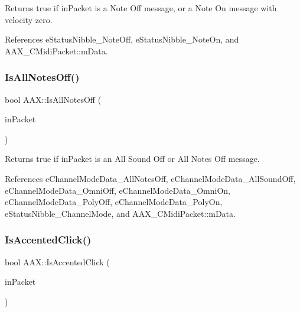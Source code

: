 Returns true if {\ttfamily in\+Packet} is a Note Off message, or a Note On message with velocity zero. 



References e\+Status\+Nibble\+\_\+\+Note\+Off, e\+Status\+Nibble\+\_\+\+Note\+On, and A\+A\+X\+\_\+\+C\+Midi\+Packet\+::m\+Data.

\mbox{\label{a00852_a509974acde19fde832cd5fdeb5eaabe2}} 
\subsubsection{\texorpdfstring{IsAllNotesOff()}{IsAllNotesOff()}}
{\footnotesize\ttfamily bool A\+A\+X\+::\+Is\+All\+Notes\+Off (\begin{DoxyParamCaption}\item[{const \mbox{\hyperlink{a01429}{A\+A\+X\+\_\+\+C\+Midi\+Packet}} $\ast$}]{in\+Packet }\end{DoxyParamCaption})\hspace{0.3cm}{\ttfamily [inline]}}



Returns true if {\ttfamily in\+Packet} is an All Sound Off or All Notes Off message. 



References e\+Channel\+Mode\+Data\+\_\+\+All\+Notes\+Off, e\+Channel\+Mode\+Data\+\_\+\+All\+Sound\+Off, e\+Channel\+Mode\+Data\+\_\+\+Omni\+Off, e\+Channel\+Mode\+Data\+\_\+\+Omni\+On, e\+Channel\+Mode\+Data\+\_\+\+Poly\+Off, e\+Channel\+Mode\+Data\+\_\+\+Poly\+On, e\+Status\+Nibble\+\_\+\+Channel\+Mode, and A\+A\+X\+\_\+\+C\+Midi\+Packet\+::m\+Data.

\mbox{\label{a00852_afd05400c946e625772428cad4be7d552}} 
\subsubsection{\texorpdfstring{IsAccentedClick()}{IsAccentedClick()}}
{\footnotesize\ttfamily bool A\+A\+X\+::\+Is\+Accented\+Click (\begin{DoxyParamCaption}\item[{const \mbox{\hyperlink{a01429}{A\+A\+X\+\_\+\+C\+Midi\+Packet}} $\ast$}]{in\+Packet }\end{DoxyParamCaption})\hspace{0.3cm}{\ttfamily [inline]}}



